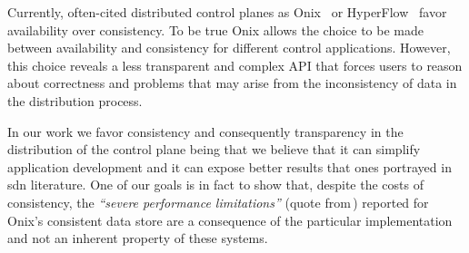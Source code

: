Currently, often-cited distributed control planes as Onix~\cite{Koponen:2010th} or HyperFlow~\cite{Tootoonchian:2010vy} favor availability over consistency. To be true Onix allows the choice to be made between availability and consistency for different control applications. However, this choice reveals a less transparent and complex API that forces users to reason about correctness and problems that may arise from the inconsistency of data in the distribution process. 

In our work we favor consistency and consequently transparency in the distribution of the control plane being that we believe that it can simplify application development and it can expose better results that ones portrayed in \gls{sdn} literature.
One of our goals is in fact to show that, despite the costs of consistency, the \emph{``severe performance limitations''} (quote from\,\cite{Koponen:2010th}) reported for Onix's consistent  data store are a consequence of the particular implementation and not an inherent property of these systems. 



